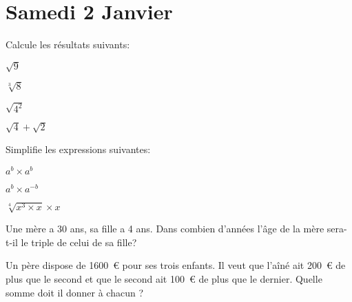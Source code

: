 \section{Samedi 2 Janvier}



\begin{exercicefr}
    Calcule les résultats suivants:
    \begin{exerciceenum}
        \item $\sqrt{9}$
        \item $\sqrt[3]{8}$
        \item $\sqrt{4^2}$
        \item $\sqrt{4} + \sqrt{2}$
    \end{exerciceenum}
\end{exercicefr}

\begin{exercicefr}
    Simplifie les expressions suivantes:
    \begin{exerciceenum}
        \item $a^b \times a^b$
        \item $a^b \times a^{-b}$
        \item $\sqrt[4]{x^3 \times x} \times x$
    \end{exerciceenum}
\end{exercicefr}

\begin{exercicefr}
    Une mère a 30 ans, sa fille a 4 ans. Dans combien d'années l'âge de la mère sera-t-il le triple de celui de sa fille?
\end{exercicefr}

\begin{exercicefr}
    Un père dispose de 1600~€ pour ses trois enfants. Il veut que l'aîné ait 200~€ de plus que le second et que le second ait 100~€ de plus que le dernier. Quelle somme doit il donner à chacun ?
\end{exercicefr}

